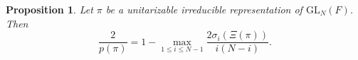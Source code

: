 \documentclass{amsart}
\newcommand{\lf}{\left}
\newcommand{\ri}{\right}
\newcommand{\f}{\frac}
\newcommand{\GL}{\mathrm{GL}}
\newcommand{\1}{\m 1}
\newtheorem{prop}[thm]{Proposition}
\theoremstyle{remark}
\theoremstyle{definition}
\newtheorem{dfn}[thm]{Definition}
\numberwithin{equation}{subsection}
\begin{document}


\begin{prop}\label{prop:matrixdecay}
Let $\pi$ be a unitarizable irreducible representation of $\GL_N(F)$. Then
\[
\f 2{p(\pi)} =  1 - \max_{1 \leq i \leq N-1} \f{2 \sigma_i(\Xi(\pi))}{i(N-i)}.
\]
\end{prop}
\end{document}
